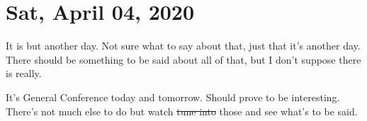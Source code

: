 \section{Sat, April 04, 2020}
It is but another day. Not sure what to say about that, just that it's another day.
There should be something to be said about all of that, but I don't suppose there
is really.

It's General Conference today and tomorrow. Should prove to be interesting. There's
not much else to do but watch \st{tune into} those and see what's to be said.
